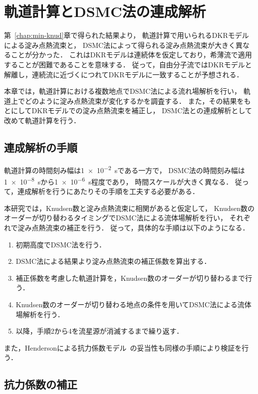 \chapter{軌道計算とDSMC法の連成解析}
\label{chap:couple}

第~\ref{chap:min-knud}章で得られた結果より，
軌道計算で用いられるDKRモデルによる淀み点熱流束と，
DSMC法によって得られる淀み点熱流束が大きく異なることが分かった．
これはDKRモデルは連続体を仮定しており，希薄流で適用することが困難であることを意味する．
従って，自由分子流ではDKRモデルと解離し，連続流に近づくにつれてDKRモデルに一致することが予想される．

本章では，軌道計算における複数地点でDSMC法による流れ場解析を行い，
軌道上でどのように淀み点熱流束が変化するかを調査する．
また，その結果をもとにしてDKRモデルでの淀み点熱流束を補正し，
DSMC法との連成解析として改めて軌道計算を行う．

\section{連成解析の手順}
軌道計算の時間刻み幅は\SI{1e-2}{s}である一方で，
DSMC法の時間刻み幅は\SI{1e-8}{s}から\SI{1e-6}{s}程度であり，
時間スケールが大きく異なる．
従って，連成解析を行うにあたりその手順を工夫する必要がある．

本研究では，Knudsen数と淀み点熱流束に相関があると仮定して，
Knudsen数のオーダーが切り替わるタイミングでDSMC法による流体場解析を行い，
それぞれで淀み点熱流束の補正を行う．
従って，具体的な手順は以下のようになる．
\begin{enumerate}
    \item 初期高度でDSMC法を行う．
    \item DSMC法による結果より淀み点熱流束の補正係数を算出する．
    \item 補正係数を考慮した軌道計算を，Knudsen数のオーダーが切り替わるまで行う．
    \item Knudsen数のオーダーが切り替わる地点の条件を用いてDSMC法による流体場解析を行う．
    \item 以降，手順2から4を流星源が消滅するまで繰り返す．
\end{enumerate}
また，Hendersonによる抗力係数モデル~\cite{henderson1976drag}の妥当性も同様の手順により検証を行う．

\section{抗力係数の補正}
